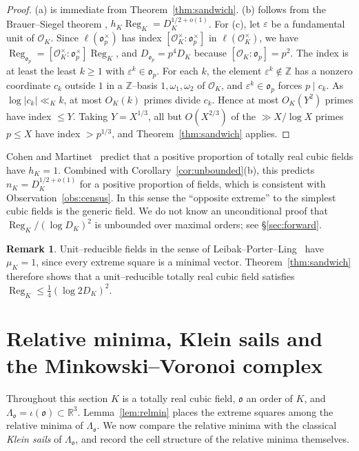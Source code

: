 \documentclass[11pt,reqno]{amsart}
\theoremstyle{plain}
\theoremstyle{definition}
\newtheorem{remark}[theorem]{Remark}
\newcommand{\Z}{\mathbb{Z}}
\newcommand{\R}{\mathbb{R}}
\newcommand{\Reg}{\operatorname{Reg}}
\newcommand{\Ok}{\mathfrak{o}}
\newcommand{\nK}{n_K}
\newcommand{\muK}{\mu_K}
\begin{document}
\begin{proof}
(a) is immediate from Theorem~\ref{thm:sandwich}. (b) follows from the Brauer--Siegel theorem
\cite{Brauer}, $h_K\Reg_K=D_K^{1/2+o(1)}$. For (c), let $\varepsilon$ be a fundamental unit of $\mathcal O_K$.
Since $\ell(\Ok_p^\times)$ has index $[\mathcal O_K^\times:\Ok_p^\times]$ in $\ell(\mathcal O_K^\times)$, we have
$\Reg_{\Ok_p}=[\mathcal O_K^\times:\Ok_p^\times]\Reg_K$, and $D_{\Ok_p}=p^4D_K$ because
$[\mathcal O_K:\Ok_p]=p^2$. The index is at least the least $k\ge1$ with $\varepsilon^k\in\Ok_p$. For each $k$,
the element $\varepsilon^k\notin\Z$ has a nonzero coordinate $c_k$ outside $1$ in a $\Z$--basis
$1,\omega_1,\omega_2$ of $\mathcal O_K$, and $\varepsilon^k\in\Ok_p$ forces $p\mid c_k$. As $\log|c_k|\ll_Kk$,
at most $O_K(k)$ primes divide $c_k$. Hence at most $O_K(Y^2)$ primes have index $\le Y$. Taking
$Y=X^{1/3}$, all but $O(X^{2/3})$ of the $\gg X/\log X$ primes $p\le X$ have index $>p^{1/3}$, and
Theorem~\ref{thm:sandwich} applies.
\end{proof}

Cohen and Martinet~\cite{CM} predict that a positive proportion of totally real cubic fields have $h_K=1$.
Combined with Corollary~\ref{cor:unbounded}(b), this predicts $\nK=D_K^{1/2+o(1)}$ for a positive proportion of
fields, which is consistent with Observation~\ref{obs:census}. In this sense the ``opposite extreme'' to the
simplest cubic fields is the generic field. We do not know an unconditional proof that
$\Reg_K/(\log D_K)^2$ is unbounded over maximal orders; see \S\ref{sec:forward}.

\begin{remark}
Unit--reducible fields in the sense of Leibak--Porter--Ling~\cite{LPL} have $\muK=1$, since every extreme square
is a minimal vector. Theorem~\ref{thm:sandwich} therefore shows that a unit--reducible totally real cubic
field satisfies $\Reg_K\le\tfrac14(\log2D_K)^2$.
\end{remark}

\section{Relative minima, Klein sails and the Minkowski--Voronoi complex}\label{sec:sails}

Throughout this section $K$ is a totally real cubic field, $\Ok$ an order of $K$, and
$\Lambda_\Ok=\iota(\Ok)\subset\R^3$. Lemma~\ref{lem:relmin} places the extreme squares among the relative
minima of $\Lambda_\Ok$. We now compare the relative minima with the classical \emph{Klein sails} of
$\Lambda_\Ok$, and record the cell structure of the relative minima themselves.
\end{document}
